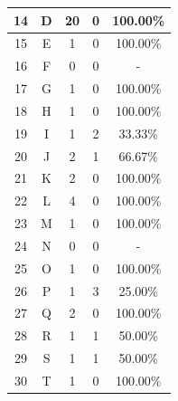 \begin{longtable}[c]{|c|c|c|c|c|}
	14           & D                 & 20                       & 0                       &100.00\%            \\ \hline
	15           & E                 & 1                       & 0                       &100.00\%            \\ \hline
	16           & F                 & 0                       & 0                       & -            \\ \hline
	17           & G                 & 1                       & 0                       &100.00\%            \\ \hline
	18           & H                 & 1                       & 0                       &100.00\%            \\ \hline
	19           & I                 & 1                       & 2                       &33.33\%            \\ \hline
	20           & J                 & 2                       & 1                       &66.67\%            \\ \hline
	21           & K                 & 2                       & 0                       &100.00\%            \\ \hline
	22           & L                 & 4                       & 0                       &100.00\%            \\ \hline
	23           & M                 & 1                       & 0                       &100.00\%            \\ \hline
	24           & N                 & 0                       & 0                       & -            \\ \hline
	25           & O                 & 1                       & 0                       &100.00\%            \\ \hline
	26           & P                 & 1                       & 3                       &25.00\%            \\ \hline
	27           & Q                 & 2                       & 0                       &100.00\%            \\ \hline
	28           & R                 & 1                       & 1                       &50.00\%            \\ \hline
	29           & S                 & 1                       & 1                       &50.00\%            \\ \hline
	30           & T                 & 1                       & 0                       &100.00\%            \\ \hline

\end{longtable}
